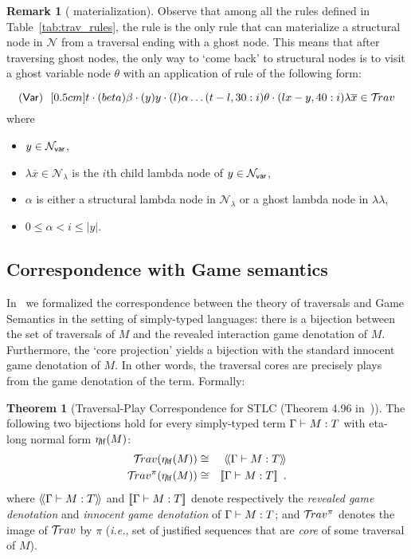 \documentclass{article}
\makeatletter
\theoremstyle{definition}
\newtheorem{remark}{Remark}[section]
\newtheorem{theorem}{Theorem}[section]
\newcommand\Nodes{\mathcal{N}}%
\newcommand\NodesVar{\Nodes_{\sf var}}%
\newcommand\NodesLmd{\Nodes_\lambda}%
\newcommand{\ghostlmd}{{\lambda\!\!\lambda}}
\newcommand{\ghostvar}{\theta}
\newcommand{\travulc}{\travset}
\def\coresymbol{\pi} %
\renewcommand\ie{{\it i.e.\@\xspace}}
\makeatother
\begin{document}
\begin{remark}[ materialization]
Observe that among all the rules defined in Table~\ref{tab:trav_rules}, the rule  is the only rule that can materialize a structural node in $\Nodes$ from a traversal ending with a ghost node. This means that after traversing ghost nodes, the only way to `come back' to structural nodes is to visit a ghost variable node $\ghostvar$ with an application of rule  of the following form:

$$\rulename{Var}\ \  \Pstr[0.5cm]{ t \cdot(beta){\beta} \cdot
(y){y} \cdot (l){\alpha}  \ldots (t-l,30:i){\ghostvar}
    \cdot (lx-y,40:i){\lambda \overline{x}}
     \in\travulc}$$
where
\begin{itemize}
\item $y \in \NodesVar$,
\item $\lambda \overline{x} \in \NodesLmd$ is the $i$th child lambda node of $y \in \NodesVar$,
\item $\alpha$ is either a structural lambda node in $\Nodes_\lambda$ or a ghost lambda node in $\ghostlmd$,
\item $0\leq \alpha < i \leq |y|$.
\end{itemize}
\end{remark}

\subsection{Correspondence with Game semantics}
\label{sec:traversal_correspondence_stlc}

In~\cite{BlumPhd} we formalized the correspondence between the theory of traversals and Game Semantics in the setting of simply-typed languages: there is a bijection between the set of traversals of $M$ and the revealed interaction game denotation of $M$. Furthermore, the `core projection' yields a bijection with the standard innocent game denotation of $M$.
In other words, the traversal cores are precisely plays from the game denotation of the term.
Formally:
\begin{theorem}[Traversal-Play Correspondence for STLC (Theorem 4.96 in~\cite{BlumPhd})]
\label{thm:gamesem_correspondence_stlc}
The following two bijections hold for every simply-typed term $\Gamma \vdash M :T$ with eta-long normal form $\eta_{\sf lf}(M)$:
\begin{eqnarray*}
 \travulc(\etalf{M}) & \cong & \revsem{\Gamma \entail M :T} \\
 \travulc^\coresymbol(\etalf{M}) & \cong & \sem{\Gamma \entail M :T} \enspace .
\end{eqnarray*}
where ${\langle\!\langle \Gamma \vdash M : T \rangle\!\rangle}$ and
${[\![ \Gamma \vdash M : T ]\!]}$
denote respectively the \emph{revealed game denotation} and \emph{innocent game denotation} of
$\Gamma \vdash M : T$;
and $\travulc^\coresymbol$ denotes the image of $\travulc$ by $\coresymbol$ (\ie, set of justified sequences that are \emph{core} of some traversal of $M$).
\end{theorem}
\end{document}

